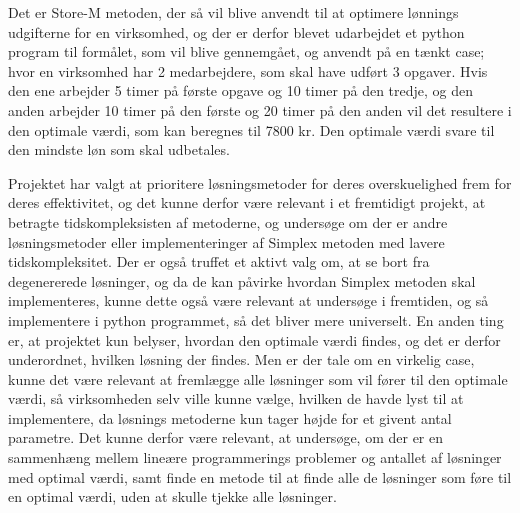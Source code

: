 Det er Store-M metoden, der så vil blive anvendt til at optimere lønnings udgifterne for en virksomhed, og der er derfor blevet udarbejdet et python program
til formålet, som vil blive gennemgået, og anvendt på en tænkt case; hvor en virksomhed har 2 medarbejdere, som skal have udført 3 opgaver. 
Hvis den ene arbejder 5 timer på første opgave og 10 timer på den tredje, og den anden arbejder 10 timer på den første og 20 timer på den anden vil det resultere i den optimale værdi, som kan beregnes til 7800 kr. Den optimale værdi svare til den mindste løn som skal udbetales.


Projektet har valgt at prioritere løsningsmetoder for deres overskuelighed frem for deres effektivitet, og det kunne derfor være relevant i et fremtidigt projekt,
at betragte tidskompleksisten af metoderne, og undersøge om der er andre løsningsmetoder eller implementeringer af Simplex metoden med lavere tidskompleksitet.
Der er også truffet et aktivt valg om, at se bort fra degenererede løsninger, og da de kan påvirke hvordan Simplex metoden skal implementeres, kunne dette også
være relevant at undersøge i fremtiden, og så implementere i python programmet, så det bliver mere universelt.
En anden ting er, at projektet kun belyser, hvordan den optimale værdi findes, og det er derfor underordnet, hvilken løsning der findes. 
Men er der tale om en virkelig case, kunne det være relevant at fremlægge alle løsninger som vil fører til den optimale værdi, så virksomheden selv ville 
kunne vælge, hvilken de havde lyst til at implementere, da løsnings metoderne kun tager højde for et givent antal parametre.
Det kunne derfor være relevant, at undersøge, om der er en sammenhæng mellem lineære programmerings problemer og antallet af løsninger med optimal værdi,
samt finde en metode til at finde alle de løsninger som føre til en optimal værdi, uden at skulle tjekke alle løsninger.